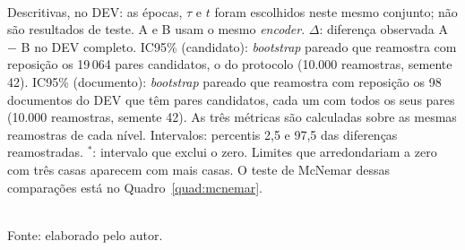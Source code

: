 \begin{table}[htbp]
\\[2pt]
  \parbox{\textwidth}{\footnotesize Descritivas, no DEV: as épocas, $\tau$ e $t$ foram escolhidos neste mesmo conjunto; não são resultados de teste. A e B usam o mesmo \emph{encoder}. $\Delta$: diferença observada A $-$ B no DEV completo. IC95\% (candidato): \emph{bootstrap} pareado que reamostra com reposição os 19\,064 pares candidatos, o do protocolo (10.000 reamostras, semente 42). IC95\% (documento): \emph{bootstrap} pareado que reamostra com reposição os 98 documentos do DEV que têm pares candidatos, cada um com todos os seus pares (10.000 reamostras, semente 42). As três métricas são calculadas sobre as mesmas reamostras de cada nível. Intervalos: percentis 2,5 e 97,5 das diferenças reamostradas. $^{\ast}$: intervalo que exclui o zero. Limites que arredondariam a zero com três casas aparecem com mais casas. O teste de McNemar dessas comparações está no Quadro~\ref{quad:mcnemar}.}\\[4pt]
  {\footnotesize Fonte: elaborado pelo autor.}
\end{table}
